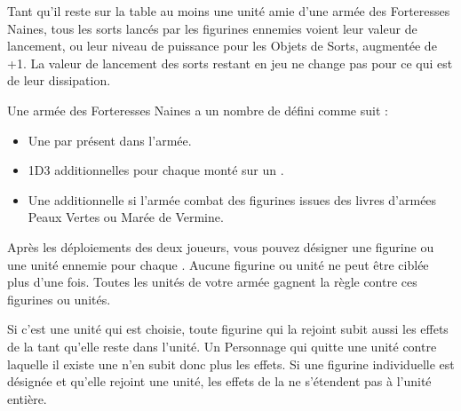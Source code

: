 \newcommand{\whirlingchainsofdoomrule}{%
Arme de Corps à Corps. Le porteur gagne +1 en Force, \randomattacks{3D3} et attaque à Initiative 10. Il ne peut pas être rejoint par un Personnage.
}

\newcommand{\swiwelgunrule}{%
Arme de Tir. \range{24}, Force 4, \armourpiercing{1}, \multipleshots{4}, \quicktofire{}.
}











\startarmywiderules

\armywideruleentry{\hewnoutofmountains}

Tant qu'il reste sur la table au moins une unité amie d'une armée des Forteresses Naines, tous les sorts lancés par les figurines ennemies voient leur valeur de lancement, ou leur niveau de puissance pour les Objets de Sorts, augmentée de +1. La valeur de lancement des sorts restant en jeu ne change pas pour ce qui est de leur dissipation.

\armywideruleentry{\ancientgrudge}

Une armée des Forteresses Naines a un nombre de \ancientgrudges{} défini comme suit :
\begin{itemize}[label={-}]
\item Une \ancientgrudge{} par \king{} présent dans l'armée.
\item 1D3 \ancientgrudges{} additionnelles pour chaque \king{} monté sur un \warthrone{}.
\item Une \ancientgrudge{} additionnelle si l'armée combat des figurines issues des livres d'armées Peaux Vertes ou Marée de Vermine.
\end{itemize}

Après les déploiements des deux joueurs, vous pouvez désigner une figurine ou une unité ennemie pour chaque \ancientgrudge{}. Aucune figurine ou unité ne peut être ciblée plus d'une fois. Toutes les unités de votre armée gagnent la règle \hatred{} contre ces figurines ou unités.

Si c'est une unité qui est choisie, toute figurine qui la rejoint subit aussi les effets de la \ancientgrudge{} tant qu'elle reste dans l'unité. Un Personnage qui quitte une unité contre laquelle il existe une \ancientgrudge{} n'en subit donc plus les effets. Si une figurine individuelle est désignée et qu'elle rejoint une unité, les effets de la \ancientgrudge{} ne s'étendent pas à l'unité entière. 


